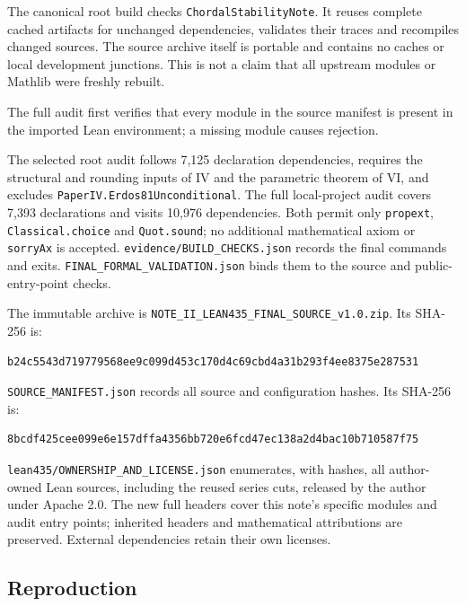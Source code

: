 \documentclass[english,11pt,a4paper]{article}
\begin{document}
The canonical root build checks \nolinkurl{ChordalStabilityNote}. It reuses
complete cached artifacts for unchanged dependencies, validates their
traces and recompiles changed sources. The source archive itself is
portable and contains no caches or local development junctions. This is
not a claim that all upstream modules or Mathlib were freshly rebuilt.

The full audit first verifies that every module in the source manifest
is present in the imported Lean environment; a missing module causes
rejection.

The selected root audit follows 7,125 declaration dependencies, requires
the structural and rounding inputs of IV and the parametric theorem of
VI, and excludes \nolinkurl{PaperIV.Erdos81Unconditional}. The full
local-project audit covers 7,393 declarations and visits 10,976
dependencies. Both permit only \nolinkurl{propext},
\nolinkurl{Classical.choice} and \nolinkurl{Quot.sound}; no additional
mathematical axiom or \nolinkurl{sorryAx} is accepted.
\nolinkurl{evidence/BUILD_CHECKS.json} records the final commands and
exits. \nolinkurl{FINAL_FORMAL_VALIDATION.json} binds them to the source
and public-entry-point checks.

The immutable archive is
\nolinkurl{NOTE_II_LEAN435_FINAL_SOURCE_v1.0.zip}. Its SHA-256 is:

\begin{verbatim}
b24c5543d719779568ee9c099d453c170d4c69cbd4a31b293f4ee8375e287531
\end{verbatim}

\nolinkurl{SOURCE_MANIFEST.json} records all source and configuration
hashes. Its SHA-256 is:

\begin{verbatim}
8bcdf425cee099e6e157dffa4356bb720e6fcd47ec138a2d4bac10b710587f75
\end{verbatim}

\nolinkurl{lean435/OWNERSHIP_AND_LICENSE.json} enumerates, with hashes,
all author-owned Lean sources, including the reused series cuts,
released by the author under Apache 2.0. The new full headers cover this
note's specific modules and audit entry points; inherited headers and
mathematical attributions are preserved. External dependencies retain
their own licenses.

\subsection{Reproduction}\label{reproduction}
\end{document}
